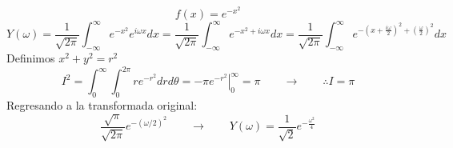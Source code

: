 \documentclass[a4paper, 14pt]{article}
\begin{document}
$$ f(x) = e^{-x^2}$$
$$ Y(\omega) = \frac{1}{\sqrt{2 \pi}}\int_{-\infty}^\infty e^{-x^2} e^{i \omega x}dx =\frac{1}{\sqrt{2 \pi}} \int_{-\infty}^\infty e^{-x^2+i \omega x}dx =  \frac{1}{\sqrt{2 \pi}} \int_{-\infty}^\infty e^{-(x+\frac{i\omega}{2})^2+ (\frac{\omega}{2})^2}dx$$
Definimos $x^2+y^2 = r^2$
$$I^2= \int_0^\infty \int_0^{2\pi} r e^{-r^2}drd\theta=\left.-\pi e^{-r^2}\right |_0^\infty =\pi \qquad \longrightarrow \qquad \therefore I=\pi$$
Regresando a la transformada original:
$$\frac{\sqrt{\pi}}{\sqrt{2 \pi}}e^{-(\omega / 2)^2} \qquad \longrightarrow \qquad Y(\omega)= \frac{1}{\sqrt{2}}e^{-\frac{\omega ^2}{4}}$$




 
\end{document}

